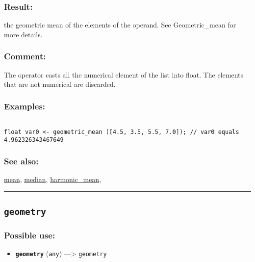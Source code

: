 \documentclass[]{book}
\providecommand{\tightlist}{%
  \setlength{\itemsep}{0pt}\setlength{\parskip}{0pt}}
\theoremstyle{definition}
\theoremstyle{definition}
\theoremstyle{definition}
\theoremstyle{remark}
\begin{document}
\subsubsection{Result:}\label{result-184}

the geometric mean of the elements of the operand. See Geometric\_mean
for more details.

\subsubsection{Comment:}\label{comment-43}

The operator casts all the numerical element of the list into float. The
elements that are not numerical are discarded.

\subsubsection{Examples:}\label{examples-139}

\begin{verbatim}
 
float var0 <- geometric_mean ([4.5, 3.5, 5.5, 7.0]); // var0 equals 4.962326343467649
\end{verbatim}

\subsubsection{See also:}\label{see-also-106}

\href{OperatorsIM\#mean}{mean}, \href{OperatorsIM\#median}{median},
\href{OperatorsDH\#harmonic_mean}{harmonic\_mean},

\begin{center}\rule{0.5\linewidth}{\linethickness}\end{center}

\subsection{\texorpdfstring{\texttt{geometry}}{geometry}}\label{geometry}

\subsubsection{Possible use:}\label{possible-use-191}

\begin{itemize}
\tightlist
\item
  \textbf{\texttt{geometry}} (\texttt{any}) ---\textgreater{}
  \texttt{geometry}
\end{itemize}
\end{document}
